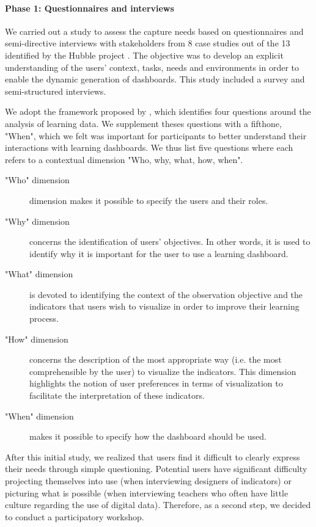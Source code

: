 \documentclass[preprint,12pt]{elsarticle}
\begin{document}
\paragraph{Phase 1: Questionnaires and interviews}
We carried out a study to assess the capture needs based on questionnaires and semi-directive interviews with stakeholders from 8 case studies out of the 13 identified by the Hubble project \cite{dabbebi2017towards}. 
The objective was to develop an explicit understanding of the users' context, tasks, needs and environments in order to enable the dynamic generation of dashboards. This study included a survey and semi-structured interviews.

We adopt the framework proposed by \citet{chatti2012reference}, which identifies four questions around the analysis of learning data. We supplement theses questions with a fifthone, "When", which we felt was important for participants to better understand their interactions with learning dashboards. We thus list five questions where each refers to a contextual dimension "Who, why, what, how, when".
\begin{description}
    \item["Who" dimension]  dimension makes it possible to specify the users and their roles.
    \item["Why" dimension] concerns the identification of users' objectives. In other words, it is used to identify why it is important for the user to use a learning dashboard.
    \item["What" dimension]  is devoted to identifying the context of the observation objective and the indicators that users wish to visualize in order to improve their learning process.
    \item["How" dimension]  concerns the description of the most appropriate way (i.e. the most comprehensible by the user) to visualize the indicators. This dimension highlights the notion of user preferences in terms of visualization to facilitate the interpretation of these indicators.
    \item["When" dimension] makes it possible to specify how the dashboard should be used. 
\end{description}

After this initial study, we realized that users find it difficult to clearly express their needs through simple questioning. Potential users have significant difficulty projecting themselves into use (when interviewing designers of indicators) or picturing what is possible (when interviewing teachers who often have little culture regarding the use of digital data). Therefore, as a second step, we decided to conduct a participatory workshop.
\end{document}
